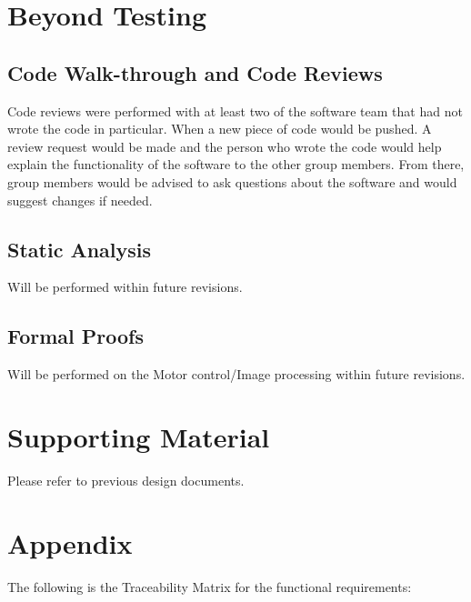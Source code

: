 \documentclass [10pt]{article}
\begin{document}
\section {Beyond Testing}

\subsection {Code Walk-through and Code Reviews}
Code reviews were performed with at least two of the software team that had not wrote the code in particular. When a new piece of code would be pushed. A review request would be made and the person who wrote the code would help explain the functionality of the software to the other group members. From there, group members would be advised to ask questions about the software and would suggest changes if needed.

\subsection {Static Analysis}
Will be performed within future revisions.

\subsection {Formal Proofs}
Will be performed on the Motor control/Image processing within future revisions.

\section {Supporting Material}

Please refer to previous design documents.

\pagebreak

\section {Appendix}
The following is the Traceability Matrix for the functional requirements: \\
\end{document}
